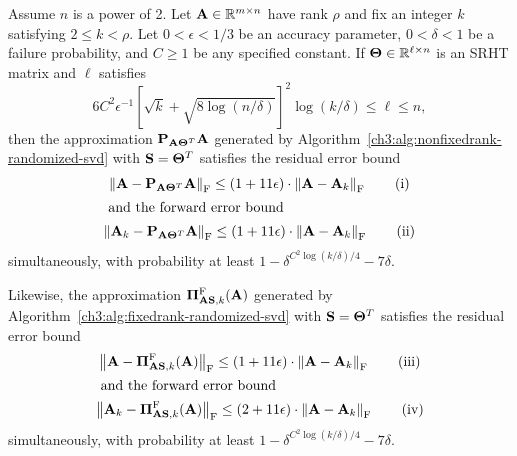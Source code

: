 \begin{thm}
\label{ch3:thm:quality-of-approximation-guarantee-Frobenius}
Assume $n$ is a power of 2. Let $\mathbf{A} \in \mathbb{R}^{m \times n}$ have rank $\rho$ and fix an integer $k$ satisfying $ 2 \leq k < \rho$. Let $0 < \epsilon < 1/3$
be an accuracy parameter, $0 < \delta < 1$ be a failure probability, and $C \ge 1$ be any specified constant. If $\mathbf{\Theta} \in \mathbb{R}^{\ell \times n}$
is an SRHT matrix and $\ell$ satisfies
\begin{equation}\label{ch3:eqn:rFrobenius}
 6 C^2 \epsilon^{-1} \left[\sqrt{k} + \sqrt{8\log(n/\delta)} \right]^2 \log(k/\delta) \leq \ell \leq n,
\end{equation}
then the approximation $\mathbf{P}_{\mathbf{A} \mathbf{\Theta}^T} \mathbf{A}$ generated by 
Algorithm~\ref{ch3:alg:nonfixedrank-randomized-svd} with $\mathbf{S} = \mathbf{\Theta}^T$ satisfies
the residual error bound 
\begin{gather}
 \left\|\mathbf{A} - \mathbf{P}_{\mathbf{A}\mathbf{\Theta}^T} \mathbf{A}\right\|_\mathrm{F} \leq 
 (1 + 11\epsilon)\cdot \left\|\mathbf{A} - \mathbf{A}_k\right\|_\mathrm{F} \tag{i} \\
\intertext{ and the forward error bound}
 \left\|\mathbf{A}_k - \mathbf{P}_{\mathbf{A}\mathbf{\Theta}^T} \mathbf{A}\right\|_\mathrm{F} \leq 
 (1 + 11\epsilon)\cdot \left\|\mathbf{A} - \mathbf{A}_k\right\|_\mathrm{F} \tag{ii}
\end{gather}
simultaneously, with probability at least $1-\delta^{C^2 \log(k/\delta)/4} - 7\delta.$

Likewise, the approximation $\boldsymbol{\Pi}_{\mathbf{A}\mathbf{S}, k}^{\mathrm{F}}(\mathbf{A})$ generated
by Algorithm~\ref{ch3:alg:fixedrank-randomized-svd} with $\mathbf{S} = \mathbf{\Theta}^T$
satisfies the residual error bound
\begin{gather}
  \FNorm{\matA -  \boldPi_{\matA\matS, k}^{\mathrm{F}}(\matA)  } \leq 
  (1 + 11\epsilon)\cdot \FNorm{\matA - \matA_k} \tag{iii} \\%
\intertext{ and the forward error bound }
  \FNorm{\matA_k - \boldPi_{\matA\matS, k}^{\mathrm{F}}(\matA)} \leq 
  (2 + 11\epsilon)\cdot \FNorm{\matA - \matA_k} \tag{iv}
\end{gather}
simultaneously, with probability at least $1-\delta^{C^2 \log(k/\delta)/4} - 7\delta.$
\end{thm}

